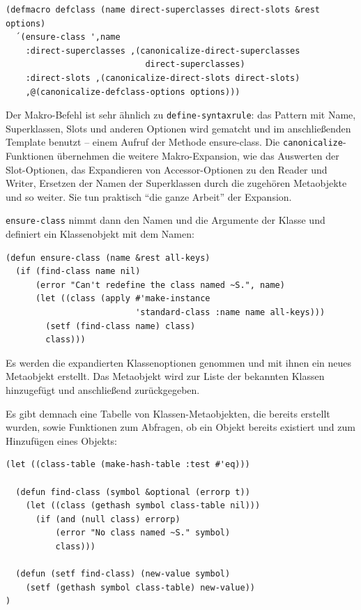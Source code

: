 \begin{lstlisting}
(defmacro defclass (name direct-superclasses direct-slots &rest options)
  ´(ensure-class ',name
    :direct-superclasses ,(canonicalize-direct-superclasses 
                            direct-superclasses)
    :direct-slots ,(canonicalize-direct-slots direct-slots)
    ,@(canonicalize-defclass-options options)))
\end{lstlisting}

Der Makro-Befehl ist sehr ähnlich zu \texttt{define-syntaxrule}: das Pattern mit Name, Superklassen, Slots und anderen Optionen wird gematcht und im anschließenden Template benutzt -- einem Aufruf der Methode ensure-class. Die \texttt{canonicalize}-Funktionen übernehmen die weitere Makro-Expansion, wie das Auswerten der Slot-Optionen, das Expandieren von Accessor-Optionen zu den Reader und Writer, Ersetzen der Namen der Superklassen durch die zugehören Metaobjekte und so weiter. Sie tun praktisch ``die ganze Arbeit'' der Expansion.

\texttt{ensure-class} nimmt dann den Namen und die Argumente der Klasse und definiert ein Klassenobjekt mit dem Namen:

\begin{lstlisting}
(defun ensure-class (name &rest all-keys)
  (if (find-class name nil)
      (error "Can't redefine the class named ~S.", name)
      (let ((class (apply #'make-instance
                          'standard-class :name name all-keys)))
        (setf (find-class name) class)
        class)))
\end{lstlisting}

Es werden die expandierten Klassenoptionen genommen und mit ihnen ein neues Metaobjekt erstellt. Das Metaobjekt wird zur Liste der bekannten Klassen hinzugefügt und anschließend zurückgegeben. 

Es gibt demnach eine Tabelle von Klassen-Metaobjekten, die bereits erstellt wurden, sowie Funktionen zum Abfragen, ob ein Objekt bereits existiert und zum Hinzufügen eines Objekts:

\begin{lstlisting}
(let ((class-table (make-hash-table :test #'eq)))
  
  (defun find-class (symbol &optional (errorp t))
    (let ((class (gethash symbol class-table nil)))
      (if (and (null class) errorp)
          (error "No class named ~S." symbol)
          class)))
  
  (defun (setf find-class) (new-value symbol)
    (setf (gethash symbol class-table) new-value))
)
\end{lstlisting}

